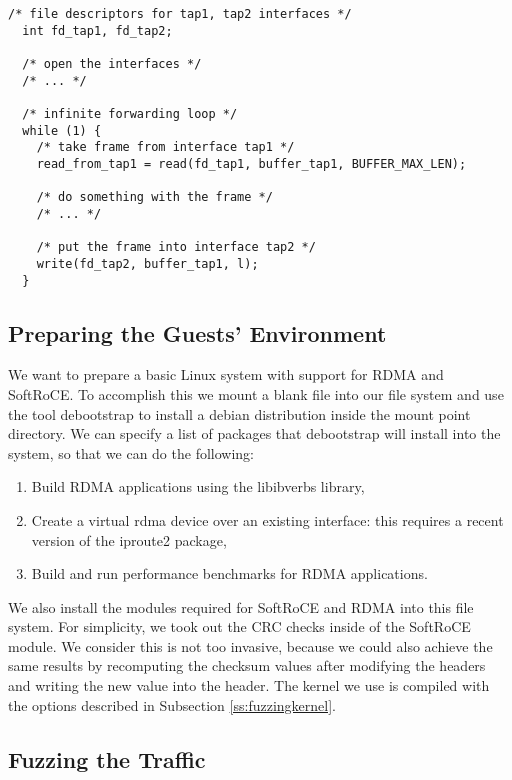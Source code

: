 \begin{lstlisting}[caption={Forwarding traffic in the proxy fuzzer process}, label={lst:fwdtraffic},  style=CStyle, float, floatplacement=H]
  /* file descriptors for tap1, tap2 interfaces */
  int fd_tap1, fd_tap2;

  /* open the interfaces */
  /* ... */

  /* infinite forwarding loop */
  while (1) {
    /* take frame from interface tap1 */
    read_from_tap1 = read(fd_tap1, buffer_tap1, BUFFER_MAX_LEN);

    /* do something with the frame */
    /* ... */

    /* put the frame into interface tap2 */
    write(fd_tap2, buffer_tap1, l);
  }
\end{lstlisting}

\subsection{Preparing the Guests' Environment}

We want to prepare a basic Linux system with support for RDMA and SoftRoCE.
To accomplish this we mount a blank file into our file system and use the tool
debootstrap to install a debian distribution inside the mount point directory.
We can specify a list of packages that debootstrap will install into the system,
so that we can do the following:

\begin{enumerate}
  \item Build RDMA applications using the libibverbs library,
  \item Create a virtual rdma device over an existing interface: this requires a recent version of the iproute2 package,
  \item Build and run performance benchmarks for RDMA applications.
\end{enumerate}

We also install the modules required for SoftRoCE and RDMA into this file system.
For simplicity, we took  out the CRC checks inside of the SoftRoCE module. We consider
this is not too invasive, because we could also achieve the same results by recomputing the checksum values after modifying
the headers and writing the new value into the header.
The kernel we use is compiled with the options described in Subsection \ref{ss:fuzzingkernel}.

\subsection{Fuzzing the Traffic}


